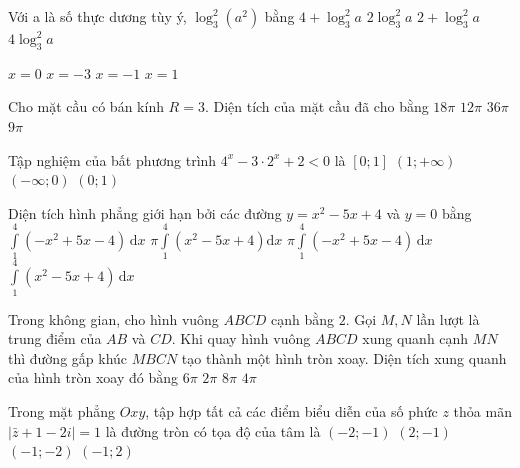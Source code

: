 \begin{ex}%
Với a là số thực dương tùy ý, $ \log_3^2\left(a^2\right) $ bằng
\choice
{$ 4+\log_3^2 a $}
{$ 2\log_3^2 a $}
{$ 2+\log_3^2 a $}
{\True $ 4\log_3^2 a $}

\end{ex}
\begin{ex}%
{
}
\choice
{$ x=0 $}
{$x=-3$}
{\True $x=-1$}
{$x=1$}
\end{ex}
\begin{ex}%
Cho mặt cầu có bán kính $ R=3 $. Diện tích của mặt cầu đã cho bằng
\choice
{$ 18\pi $}
{$12\pi$}
{\True $ 36\pi $}
{$ 9\pi $}

\end{ex}
\begin{ex}%
Tập nghiệm của bất phương trình $ 4^{x}-3\cdot 2^{x}+2<0 $ là
\choice
{\True $ [0; 1] $}
{$(1;+\infty)$}
{$ (-\infty; 0) $}
{$(0; 1)$}

\end{ex}
\begin{ex}%
Diện tích hình phẳng giới hạn bởi các đường $ y=x^2-5 x+4 $ và $ y=0 $ bằng
\choice
{\True $ \displaystyle\int\limits_1^4\left(-x^2+5 x-4\right)\mathrm{\,d}x $}
{$ \pi \displaystyle\int\limits_1^4\left(x^2-5 x+4\right) \mathrm{d} x $}
{$ \pi \displaystyle\int\limits_1^4\left(-x^2+5 x-4\right)\mathrm{\,d}x $}
{$ \displaystyle\int\limits_1^4\left(x^2-5 x+4\right)\mathrm{\,d}x $}

\end{ex}
\begin{ex}%
Trong không gian, cho hình vuông $ ABCD $ cạnh bằng $2$. Gọi $M, N$ lần lượt là trung điểm của $ AB $ và $ CD $. Khi quay hình vuông $ ABCD $ xung quanh cạnh $MN$ thì đường gấp khúc $ MBCN $ tạo thành một hình tròn xoay. Diện tích xung quanh của hình tròn xoay đó bằng
\choice
{$ 6\pi $}
{$ 2\pi $}
{$8\pi$}
{\True $4\pi$}

\end{ex}
\begin{ex}%
Trong mặt phẳng $ O x y $, tập hợp tất cả các điểm biểu diễn của số phức $z$ thỏa mãn$ |\bar{z}+1-2 i|=1 $ là đường tròn có tọa độ của tâm là
\choice
{$ (-2;-1) $}
{$(2;-1)$}
{\True $ (-1;-2) $}
{$(-1; 2)$}

\end{ex}
